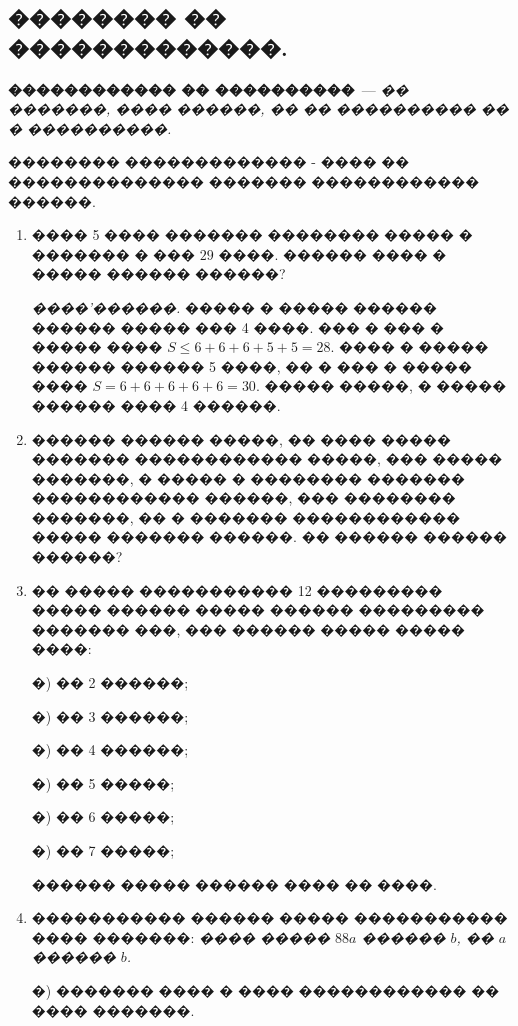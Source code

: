 \documentclass[a4paper,12pt]{article}
\begin{document}





\begin{center}
\section*{�������� �� �������������.}
\end{center}

\textbf{������������ �� ����������}~--- \textit{�� �������, ���� ������, �� �� ���������� �� � ����������.}

�������� ������������� - ���� �� �������������� ������� ������������ ������.

\medskip\medskip\medskip

\begin{enumerate}

hello world

\item ���� 5 ���� ������� �������� ����� � ������� � ��� $29$ ����. ������ ���� � ����� ������ ������?

\textit{����'������.} ����� � ����� ������ ������ ����� ��� 4 ����. ��� � ��� � ����� ���� $S\leq 6 + 6+ 6+ 5+ 5 = 28$. ���� � ����� ������ ������ 5 ����, �� � ��� � ����� ���� $S = 6+6+6+6+6=30$. ����� �����, � ����� ������ ���� 4 ������.

\item ������ ������ �����, �� ���� ����� ������� ������������ �����, ��� ����� �������, � ����� � �������� ������� ������������ ������, ��� �������� �������, �� � ������� ������������ ����� ������� ������. �� ������ ������ ������?

\item �� ����� ����������� 12 ��������� ����� ������ ����� ������ ��������� ������� ���, ��� ������ ����� ����� ����:

    �) �� 2 ������;

    �) �� 3 ������;

    �) �� 4 ������;

    �) �� 5 �����;

    �) �� 6 �����;

    �) �� 7 �����;

 ������ ����� ������ ���� �� ����.


\item ����������� ������ ����� ����������� ���� �������: \textit{���� ����� $88a$ ������ $b$, �� $a$ ������ $b$.}

    �) ������� ���� � ���� ������������ �� ���� �������.


\end{enumerate}
\end{document}
